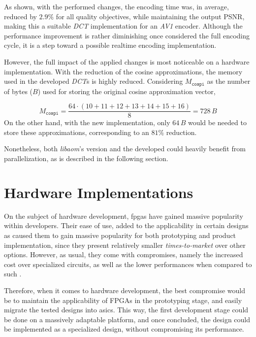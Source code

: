 As shown, with the performed changes, the encoding time was, in average, reduced by $2.9\%$ for all quality objectives, while maintaining the output PSNR, making this a suitable \emph{DCT} implementation for an \emph{AV1} encoder. Although the performance improvement is rather diminishing once considered the full encoding cycle, it is a step toward a possible realtime encoding implementation.

However, the full impact of the applied changes is most noticeable on a hardware implementation. With the reduction of the cosine approximations, the memory used in the developed \emph{DCT}s is highly reduced. Considering $M_{\texttt{cospi}}$ as the number of bytes ($B$) used for storing the original cosine approximation vector,

\begin{equation}
    M_{\texttt{cospi}} = \frac{64\cdot (10+11+12+13+14+15+16)}{8} = 728\, B
\end{equation}
On the other hand, with the new implementation, only $64 \, B$  would be needed to store these approximations, corresponding to an $81\%$ reduction.

Nonetheless, both \emph{libaom}'s version and the developed could heavily benefit from parallelization, as is described in the following section.

\section{Hardware Implementations}

On the subject of hardware development, \glspl{fpga} have gained massive popularity within developers. Their ease of use, added to the applicability in certain designs as caused them to gain massive popularity for both prototyping and product implementation, since they present relatively smaller \emph{times-to-market} over other options. However, as usual, they come with compromises, namely the increased cost over specialized circuits, as well as the lower performances when compared to such \cite{FPGAVsASIC2016}.

Therefore, when it comes to hardware development, the best compromise would be to maintain the applicability of FPGAs in the prototyping stage, and easily migrate the tested designs into \glspl{asic}. This way, the first development stage could be done on a massively adaptable platform, and once concluded, the design could be implemented as a specialized design, without compromising its performance.

